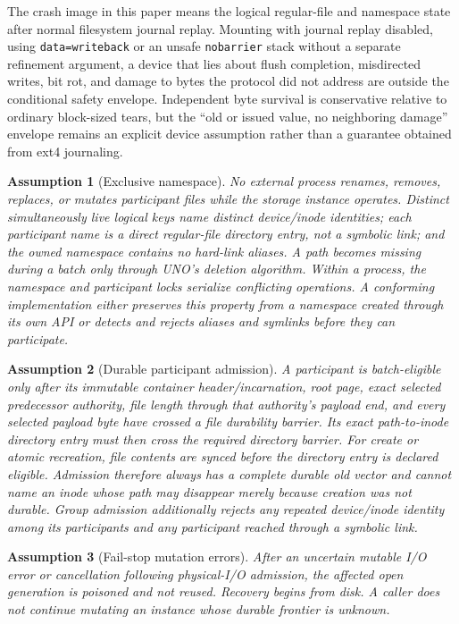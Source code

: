 \documentclass[10pt,twocolumn]{article}
\newtheorem{assumption}{Assumption}
\theoremstyle{remark}
\newcommand{\code}[1]{\texttt{#1}}
\begin{document}
The crash image in this paper means the logical regular-file and namespace state after normal
filesystem journal replay. Mounting with journal replay disabled, using \code{data=writeback} or an
unsafe \code{nobarrier} stack without a separate refinement argument, a device that lies about
flush completion, misdirected writes, bit rot, and damage to bytes the protocol did not address are
outside the conditional safety envelope. Independent byte survival is conservative relative to
ordinary block-sized
tears, but the ``old or issued value, no neighboring damage'' envelope remains an explicit device
assumption rather than a guarantee obtained from ext4 journaling.

\begin{assumption}[Exclusive namespace]\label{a:namespace}
No external process renames, removes, replaces, or mutates participant files while the storage
instance operates. Distinct simultaneously live logical keys name distinct device/inode identities;
each participant name is a direct regular-file directory entry, not a symbolic link; and the owned
namespace contains no hard-link aliases. A path becomes missing during a
batch only through UNO's deletion algorithm. Within a process, the namespace and participant locks
serialize conflicting operations. A conforming implementation either preserves this property from
a namespace created through its own API or detects and rejects aliases and symlinks before they can
participate.
\end{assumption}

\begin{assumption}[Durable participant admission]\label{a:admission}
A participant is batch-eligible only after its immutable container header/incarnation, root page,
exact selected predecessor authority, file length through that authority's payload end, and every selected
payload byte have crossed a file durability barrier. Its exact path-to-inode directory entry must
then cross the required directory barrier. For create or atomic recreation, file contents are
synced before the directory entry is declared eligible. Admission therefore always has a complete
durable old vector and cannot name an inode whose path may disappear merely because creation was
not durable. Group admission additionally rejects any repeated device/inode identity among its
participants and any participant reached through a symbolic link.
\end{assumption}

\begin{assumption}[Fail-stop mutation errors]\label{a:failstop}
After an uncertain mutable I/O error or cancellation following physical-I/O admission, the affected
open generation is poisoned and not reused. Recovery begins from disk. A caller does not continue
mutating an instance whose durable frontier is unknown.
\end{assumption}
\end{document}
